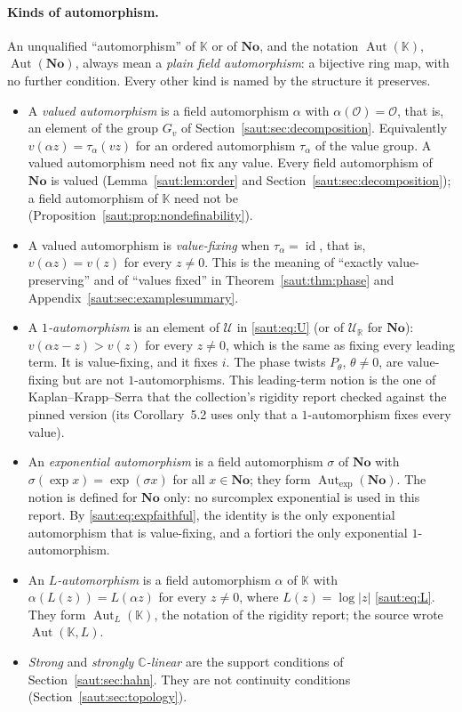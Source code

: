 \documentclass[11pt]{article}
\theoremstyle{definition}
\theoremstyle{remark}
\newcommand{\No}{\mathbf{No}}
\newcommand{\R}{\mathbb R}
\newcommand{\C}{\mathbb C}
\newcommand{\K}{\mathbb K}
\newcommand{\OO}{\mathcal O}
\newcommand{\U}{\mathcal U}
\newcommand{\id}{\operatorname{id}}
\newcommand{\Aut}{\operatorname{Aut}}
\newcommand{\Gexp}{\operatorname{Aut}_{\exp}(\No)}
\newcommand{\AutL}{\operatorname{Aut}_{L}}
\numberwithin{equation}{section}
\begin{document}
\paragraph{Kinds of automorphism.} An unqualified ``automorphism'' of $\K$
or of $\No$, and the notation $\Aut(\K)$, $\Aut(\No)$, always mean a
\emph{plain field automorphism}: a bijective ring map, with no further
condition. Every other kind is named by the structure it preserves.
\begin{itemize}
\item A \emph{valued automorphism} is a field automorphism $\alpha$ with
$\alpha(\OO)=\OO$, that is, an element of the group $G_v$ of
Section~\ref{saut:sec:decomposition}. Equivalently
$v(\alpha z)=\tau_\alpha(v z)$ for an ordered automorphism $\tau_\alpha$ of
the value group. A valued automorphism need not fix any value. Every field
automorphism of $\No$ is valued (Lemma~\ref{saut:lem:order} and
Section~\ref{saut:sec:decomposition}); a field automorphism of $\K$ need not
be (Proposition~\ref{saut:prop:nondefinability}).
\item A valued automorphism is \emph{value-fixing} when $\tau_\alpha=\id$,
that is, $v(\alpha z)=v(z)$ for every $z\ne0$. This is the meaning of
``exactly value-preserving'' and of ``values fixed'' in
Theorem~\ref{saut:thm:phase} and Appendix~\ref{saut:sec:examplesummary}.
\item A \emph{$1$-automorphism} is an element of $\U$ in \eqref{saut:eq:U}
(or of $\U_{\R}$ for $\No$): $v(\alpha z-z)>v(z)$ for every $z\ne0$, which
is the same as fixing every leading term. It is value-fixing, and it fixes
$i$. The phase twists $P_\theta$, $\theta\ne0$, are value-fixing but are not
$1$-automorphisms. This leading-term notion is the one of
Kaplan--Krapp--Serra \cite{KKS} that the collection's rigidity report
checked against the pinned version (its Corollary~5.2 uses only that a
$1$-automorphism fixes every value).
\item An \emph{exponential automorphism} is a field automorphism $\sigma$ of
$\No$ with $\sigma(\exp x)=\exp(\sigma x)$ for all $x\in\No$; they form
$\Gexp$. The notion is defined for $\No$ only: no surcomplex exponential is
used in this report. By \eqref{saut:eq:expfaithful}, the identity is the
only exponential automorphism that is value-fixing, and a fortiori the only
exponential $1$-automorphism.
\item An \emph{$L$-automorphism} is a field automorphism $\alpha$ of $\K$
with $\alpha(L(z))=L(\alpha z)$ for every $z\ne0$, where $L(z)=\log|z|$
\eqref{saut:eq:L}. They form $\AutL(\K)$, the notation of the rigidity report;
the source wrote $\Aut(\K,L)$.
\item \emph{Strong} and \emph{strongly $\C$-linear} are the support
conditions of Section~\ref{saut:sec:hahn}. They are not continuity
conditions (Section~\ref{saut:sec:topology}).
\end{itemize}
\end{document}
